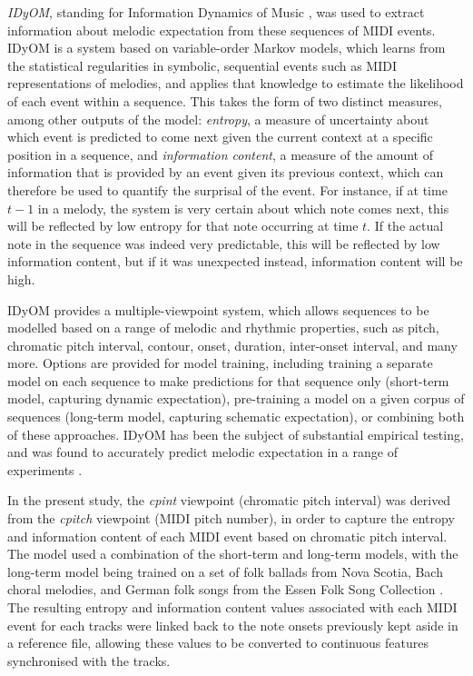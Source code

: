 \emph{IDyOM}, standing for Information Dynamics of Music \parencite{pearce2005,pearce2018}, was used to extract information about melodic expectation from these sequences of MIDI events. IDyOM is a system based on variable-order Markov models, which learns from the statistical regularities in symbolic, sequential events such as MIDI representations of melodies, and applies that knowledge to estimate the likelihood of each event within a sequence. This takes the form of two distinct measures, among other outputs of the model: \emph{entropy}, a measure of uncertainty about which event is predicted to come next given the current context at a specific position in a sequence, and \emph{information content}, a measure of the amount of information that is provided by an event given its previous context, which can therefore be used to quantify the surprisal of the event. For instance, if at time $t - 1$ in a melody, the system is very certain about which note comes next, this will be reflected by low entropy for that note occurring at time $t$. If the actual note in the sequence was indeed very predictable, this will be reflected by low information content, but if it was unexpected instead, information content will be high.

IDyOM provides a multiple-viewpoint system, which allows sequences to be modelled based on a range of melodic and rhythmic properties, such as pitch, chromatic pitch interval, contour, onset, duration, inter-onset interval, and many more. Options are provided for model training, including training a separate model on each sequence to make predictions for that sequence only (short-term model, capturing dynamic expectation), pre-training a model on a given corpus of sequences (long-term model, capturing schematic expectation), or combining both of these approaches. IDyOM has been the subject of substantial empirical testing, and was found to accurately predict melodic expectation in a range of experiments \parencite[for an extensive review, see][]{pearce2018}.

In the present study, the \emph{cpint} viewpoint (chromatic pitch interval) was derived from the \emph{cpitch} viewpoint (MIDI pitch number), in order to capture the entropy and information content of each MIDI event based on chromatic pitch interval. The model used a combination of the short-term and long-term models, with the long-term model being trained on a set of folk ballads from Nova Scotia, Bach choral melodies, and German folk songs from the Essen Folk Song Collection \parencite[for a description of this corpus, see][]{pearce2005}. The resulting entropy and information content values associated with each MIDI event for each tracks were linked back to the note onsets previously kept aside in a reference file, allowing these values to be converted to continuous features synchronised with the tracks.

